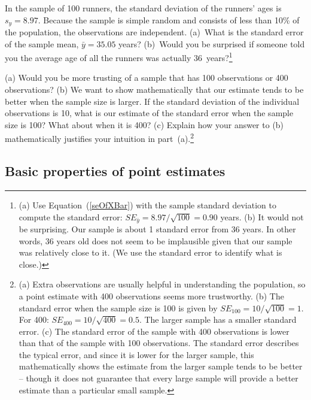 \begin{exercise}
In the sample of 100 runners, the standard deviation of the runners' ages is $s_y = 8.97$. Because the sample is simple random and consists of less than 10\% of the population, the observations are independent. (a)~What is the standard error of the sample mean, $\bar{y}=35.05$ years? (b)~Would you be surprised if someone told you the average age of all the runners was actually 36~years?\footnote{(a) Use Equation~(\ref{seOfXBar}) with the sample standard deviation to compute the standard error: $SE_{\bar{y}} = 8.97/\sqrt{100} = 0.90$ years. (b) It would not be surprising. Our sample is about 1 standard error from 36 years. In other words, 36 years old does not seem to be implausible given that our sample was relatively close to it. (We use the standard error to identify what is close.)}
\end{exercise}


\begin{exercise}
(a) Would you be more trusting of a sample that has 100 observations or 400 observations? (b) We want to show mathematically that our estimate tends to be better when the sample size is larger. If the standard deviation of the individual observations is 10, what is our estimate of the standard error when the sample size is 100? What about when it is 400? (c) Explain how your answer to (b) mathematically justifies your intuition in part~(a).\footnote{(a) Extra observations are usually helpful in understanding the population, so a point estimate with 400 observations seems more trustworthy. (b) The standard error when the sample size is 100 is given by $SE_{100} = 10/\sqrt{100} = 1$. For 400: $SE_{400} = 10/\sqrt{400} = 0.5$. The larger sample has a smaller standard error. (c) The standard error of the sample with 400 observations is lower than that of the sample with 100 observations. The standard error describes the typical error, and since it is lower for the larger sample, this mathematically shows the estimate from the larger sample tends to be better -- though it does not guarantee that every large sample will provide a better estimate than a particular small sample.}
\end{exercise}

\subsection{Basic properties of point estimates}

